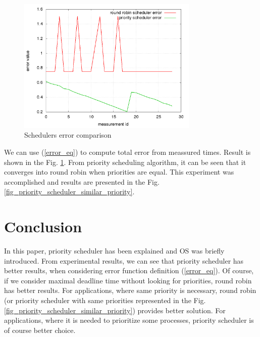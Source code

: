 \documentclass[a4paper, conference]{IEEEtran}
\begin{document}
\begin{figure}[H]
\centering
\includegraphics[width=3.4in]{scheduler_error.png}
\caption{Schedulers error comparison}
\label{fig_error}
\end{figure}

We can use (\ref{error_eq}) to compute total error from meassured times. Result is shown in the Fig. \ref{fig_error}. From priority scheduling algorithm, it can be seen that it converges into round robin when priorities are equal. This experiment was accomplished and results are presented in the Fig. \ref{fig_priority_scheduler_similar_priority}.



\section{Conclusion}
In this paper, priority scheduler has been explained and OS was briefly introduced. From experimental results, we can see that priority scheduler has better results, when considering error function definition (\ref{error_eq}). Of course, if we consider maximal deadline time without looking for priorities, round robin has better results. For applications, where same priority is necessary, round robin (or priority scheduler with same priorities represented in the Fig. \ref{fig_priority_scheduler_similar_priority}) provides better solution. For applications, where it is needed to prioritize some processes, priority scheduler is of course better choice.



\balance
\end{document}
